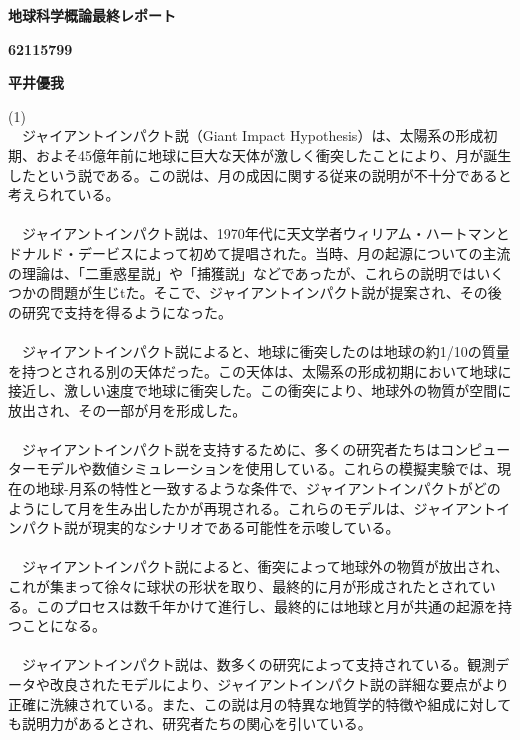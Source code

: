 \documentclass[a4paper,10.5pt]{ltjsarticle}
\begin{document}
\thispagestyle{empty}
\setcounter{page}{0}
\centerline{\vspace{320pt}}
\centerline{\vspace{30pt}\bfseries \HUGE 地球科学概論最終レポート}
\centerline{\large\bfseries 62115799}
\centerline{\large\bfseries 平井優我}
\clearpage
(1)\\
　ジャイアントインパクト説（Giant Impact Hypothesis）は、太陽系の形成初期、およそ45億年前に地球に巨大な天体が激しく衝突したことにより、月が誕生したという説である。この説は、月の成因に関する従来の説明が不十分であると考えられている。\\
\\
　ジャイアントインパクト説は、1970年代に天文学者ウィリアム・ハートマンとドナルド・デービスによって初めて提唱された。当時、月の起源についての主流の理論は、「二重惑星説」や「捕獲説」などであったが、これらの説明ではいくつかの問題が生じtた。そこで、ジャイアントインパクト説が提案され、その後の研究で支持を得るようになった。\\
\\
　ジャイアントインパクト説によると、地球に衝突したのは地球の約1/10の質量を持つとされる別の天体だった。この天体は、太陽系の形成初期において地球に接近し、激しい速度で地球に衝突した。この衝突により、地球外の物質が空間に放出され、その一部が月を形成した。\\
\\
　ジャイアントインパクト説を支持するために、多くの研究者たちはコンピューターモデルや数値シミュレーションを使用している。これらの模擬実験では、現在の地球-月系の特性と一致するような条件で、ジャイアントインパクトがどのようにして月を生み出したかが再現される。これらのモデルは、ジャイアントインパクト説が現実的なシナリオである可能性を示唆している。\\
\\
　ジャイアントインパクト説によると、衝突によって地球外の物質が放出され、これが集まって徐々に球状の形状を取り、最終的に月が形成されたとされている。このプロセスは数千年かけて進行し、最終的には地球と月が共通の起源を持つことになる。\\
\\
　ジャイアントインパクト説は、数多くの研究によって支持されている。観測データや改良されたモデルにより、ジャイアントインパクト説の詳細な要点がより正確に洗練されている。また、この説は月の特異な地質学的特徴や組成に対しても説明力があるとされ、研究者たちの関心を引いている。\\
\end{document}
